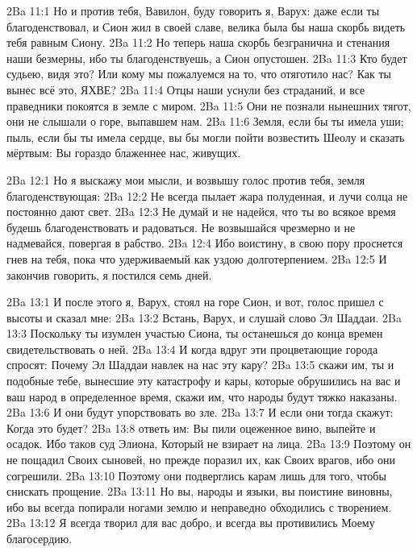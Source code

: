 \vs 2Ba 11:1
Но и против тебя, Вавилон, буду говорить я, Варух: даже если ты благоденствовал, и Сион жил в своей славе, велика была бы наша скорбь видеть тебя равным Сиону.
\vs 2Ba 11:2
Но теперь наша скорбь безгранична и стенания наши безмерны, ибо ты благоденствуешь, а Сион опустошен.
\vs 2Ba 11:3
Кто будет судьею, видя это? Или кому мы пожалуемся на то, что отяготило нас? Как ты вынес всё это, ЯХВЕ?
\vs 2Ba 11:4
Отцы наши уснули без страданий, и все праведники покоятся в земле с миром.
\vs 2Ba 11:5
Они не познали нынешних тягот, они не слышали о горе, выпавшем нам.
\vs 2Ba 11:6
Земля, если бы ты имела уши; пыль, если бы ты имела сердце, вы бы могли пойти возвестить Шеолу и сказать мёртвым: Вы гораздо блаженнее нас, живущих.

\vs 2Ba 12:1
Но я выскажу мои мысли, и возвышу голос против тебя, земля благоденствующая:
\vs 2Ba 12:2
Не всегда пылает жара полуденная, и лучи солца не постоянно дают свет.
\vs 2Ba 12:3
Не думай и не надейся, что ты во всякое время будешь благоденствовать и радоваться. Не возвышайся чрезмерно и не надмевайся, повергая в рабство.
\vs 2Ba 12:4
Ибо воистину, в свою пору проснется гнев на тебя, пока что удерживаемый как уздою долготерпением.
\vs 2Ba 12:5
И закончив говорить, я постился семь дней.

\vs 2Ba 13:1
И после этого я, Варух, стоял на горе Сион, и вот, голос пришел с высоты и сказал мне:
\vs 2Ba 13:2
Встань, Варух, и слушай слово Эл Шаддаи.
\vs 2Ba 13:3
Поскольку ты изумлен участью Сиона, ты останешься до конца времен свидетельствовать о ней.
\vs 2Ba 13:4
И когда вдруг эти процветающие города спросят: Почему Эл Шаддаи навлек на нас эту кару?
\vs 2Ba 13:5
скажи им, ты и подобные тебе, вынесшие эту катастрофу и кары, которые обрушились на вас и ваш народ в определенное время, скажи им, что народы будут тяжко наказаны.
\vs 2Ba 13:6
И они будут упорствовать во зле.
\vs 2Ba 13:7
И если они тогда скажут: Когда это будет?
\vs 2Ba 13:8
ответь им: Вы пили оцеженное вино, выпейте и осадок. Ибо таков суд Элиона, Который не взирает на лица.
\vs 2Ba 13:9
Поэтому он не пощадил Своих сыновей, но прежде поразил их, как Своих врагов, ибо они согрешили.
\vs 2Ba 13:10
Поэтому они подверглись карам лишь для того, чтобы снискать прощение.
\vs 2Ba 13:11
Но вы, народы и языки, вы поистине виновны, ибо вы всегда попирали ногами землю и неправедно обходились с творением.
\vs 2Ba 13:12
Я всегда творил для вас добро, и всегда вы противились Моему благосердию.

